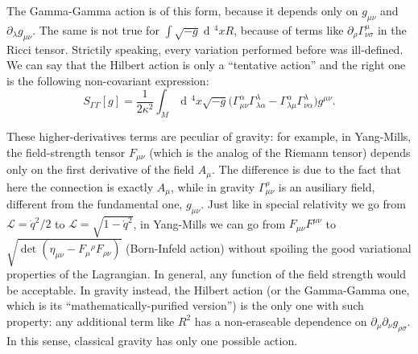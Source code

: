 \documentclass[a4paper,12pt]{book}
\newcommand{\dd}{\mathop{\mathrm{d}\!}{}}
\theoremstyle{definition}
\theoremstyle{remark}
\begin{document}
The Gamma-Gamma action is of this form, because it depends only on $g_{\mu\nu}$ and $\partial_\lambda g_{\mu\nu}$. The same is not true for $\int\sqrt{-g}\dd^4xR$, because of terms like $\partial_\rho\Gamma^\mu_{\nu\sigma}$ in the Ricci tensor. Strictily speaking, every variation performed before was ill-defined. We can say that the Hilbert action is only a ``tentative action'' and the right one is the following non-covariant expression:
\[S_{\Gamma\Gamma}[g]=\frac1{2\kappa^2}\int_M\dd^4x\sqrt{-g}\bigl(\Gamma^\alpha_{\mu\nu}\Gamma^\lambda_{\lambda\alpha}-\Gamma^\alpha_{\lambda\mu}\Gamma^\lambda_{\nu\alpha}\bigr)g^{\mu\nu}.\]

These higher-derivatives terms are peculiar of gravity: for example, in Yang-Mills, the field-strength tensor $F_{\mu\nu}$ (which is the analog of the Riemann tensor) depends only on the first derivative of the field $A_\mu$. The difference is due to the fact that here the connection is exactly $A_\mu$, while in gravity $\Gamma^\rho_{\mu\nu}$ is an ausiliary field, different from the fundamental one, $g_{\mu\nu}$. Just like in special relativity we go from $\mathcal L=\dot q^2/2$ to $\mathcal L=\sqrt{1-\dot q^2}$, in Yang-Mills we can go from $F_{\mu\nu}F^{\mu\nu}$ to $\sqrt{\det(\eta_{\mu\nu}-F_\mu{}^\rho F_{\rho\nu})}$ (Born-Infeld action) without spoiling the good variational properties of the Lagrangian. In general, any function of the field strength would be acceptable. In gravity instead, the Hilbert action (or the Gamma-Gamma one, which is its ``mathematically-purified version'') is the only one with such property: any additional term like $R^2$ has a non-eraseable dependence on $\partial_\mu\partial_\nu g_{\rho\sigma}$. In this sense, classical gravity has only one possible action.
\end{document}
